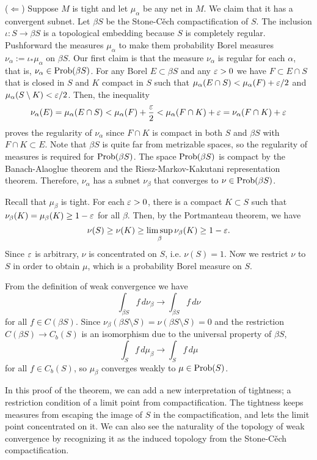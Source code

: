 \documentclass[a4paper]{article}
\begin{document}
\begin{pf}
($\Leftarrow$)
Suppose $M$ is tight and let $\mu_\alpha$ be any net in $M$.
We claim that it has a convergent subnet.
Let $\beta S$ be the Stone-C\v ech compactification of $S$.
The inclusion $\iota:S\to\beta S$ is a topological embedding because $S$ is completely regular.
Pushforward the measures $\mu_\alpha$ to make them probability Borel measures $\nu_\alpha:=\iota_*\mu_\alpha$ on $\beta S$.
Our first claim is that the measure $\nu_\alpha$ is regular for each $\alpha$, that is, $\nu_\alpha\in\operatorname{Prob}(\beta S)$.
For any Borel $E\subset\beta S$ and any $\varepsilon>0$ we have $F\subset E\cap S$ that is closed in $S$ and $K$ compact in $S$ such that $\mu_\alpha(E\cap S)<\mu_\alpha(F)+\varepsilon/2$ and $\mu_\alpha(S\setminus K)<\varepsilon/2$.
Then, the inequality
\[\nu_\alpha(E)=\mu_\alpha(E\cap S)<\mu_\alpha(F)+\frac{\varepsilon}2<\mu_\alpha(F\cap K)+\varepsilon=\nu_\alpha(F\cap K)+\varepsilon\]
proves the regularity of $\nu_\alpha$ since $F\cap K$ is compact in both $S$ and $\beta S$ with $F\cap K\subset E$.
Note that $\beta S$ is quite far from metrizable spaces, so the regularity of measures is required for $\operatorname{Prob}(\beta S)$.
The space $\operatorname{Prob}(\beta S)$ is compact by the Banach-Alaoglue theorem and the Riesz-Markov-Kakutani representation theorem.
Therefore, $\nu_\alpha$ has a subnet $\nu_\beta$ that converges to $\nu\in\operatorname{Prob}(\beta S)$.

Recall that $\mu_\beta$ is tight.
For each $\varepsilon>0$, there is a compact $K\subset S$ such that $\nu_\beta(K)=\mu_\beta(K)\ge1-\varepsilon$ for all $\beta$.
Then, by the Portmanteau theorem, we have
\[\nu(S)\ge\nu(K)\ge\limsup_\beta\nu_\beta(K)\ge1-\varepsilon.\]
Since $\varepsilon$ is arbitrary, $\nu$ is concentrated on $S$, i.e. $\nu(S)=1$.
Now we restrict $\nu$ to $S$ in order to obtain $\mu$, which is a probability Borel measure on $S$.

From the definition of weak convergence we have
\[\int_{\beta S}f\,d\nu_\beta\to\int_{\beta S}f\,d\nu\]
for all $f\in C(\beta S)$.
Since $\nu_\beta(\beta S\setminus S)=\nu(\beta S\setminus S)=0$ and the restriction $C(\beta S)\to C_b(S)$ is an isomorphism due to the universal property of $\beta S$,
\[\int_Sf\,d\mu_\beta\to\int_Sf\,d\mu\]
for all $f\in C_b(S)$, so $\mu_\beta$ converges weakly to $\mu\in\operatorname{Prob}(S)$.
\end{pf}

In this proof of the theorem, we can add a new interpretation of tightness; a restriction condition of a limit point from compactification.
The tightness keeps measures from escaping the image of $S$ in the compactification, and lets the limit point concentrated on it.
We can also see the naturality of the topology of weak convergence by recognizing it as the induced topology from the Stone-C\v ech compactification.
\end{document}

